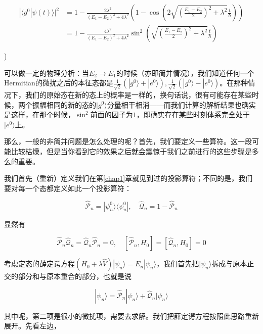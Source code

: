 \begin{equation}
\begin{split}
|\langle g^0|\psi(t)\rangle|^2 &= 1 - \frac{2\lambda^2}{(E_1-E_2)^2+4\lambda^2}\left(1-\cos\left(2\sqrt{\left( \frac{E_1-E_2}{2}\right)^2 + \lambda^2}\frac{t}{\hbar}\right)\right) \\
&= 1 - \frac{4\lambda^2}{(E_1-E_2)^2+4\lambda^2}\sin^2\left(\sqrt{\left( \frac{E_1-E_2}{2}\right)^2 + \lambda^2}\frac{t}{\hbar}\right)
\end{split}
\end{equation}

)

可以做一定的物理分析：当$E_2\to E_1$的时候（亦即简并情况），我们知道任何一个Hermitian的微扰之后的本征态都是$\frac{1}{\sqrt{2}}(|g^0\rangle + |e^0\rangle),\frac{1}{\sqrt{2}}(|g^0\rangle - |e^0\rangle)$。在那种情况下，我们的原始态在新的态上的概率是一样的，换句话说，很有可能存在某些时候，两个振幅相同的新的态的$|g^0\rangle$分量相干相消——而我们计算的解析结果也确实是这样，在那个时候，$\sin^2$前面的因子为$1$，即确实存在某些时刻体系完全处于$|e^0\rangle$上。


那么，一般的非简并问题是怎么处理的呢？首先，我们要定义一些算符。这一段可能比较枯燥，但是当你看到它的效果之后就会震惊于我们之前进行的这些步骤是多么的重要。

我们首先（重新）定义我们在第\ref{chap1}章就见到过的投影算符；不同的是，我们要对每一个态都定义如此一个投影算符：

\begin{equation}
\hat{\mathcal{P}}_n = |\psi^0_n\rangle\langle\psi^0_n|,\quad \hat{\mathcal{Q}}_n = 1-\hat{\mathcal{P}}_n 
\end{equation}

显然有

\begin{equation}
\hat{\mathcal{P}}_n \hat{\mathcal{Q}}_n = \hat{\mathcal{Q}}_n \hat{\mathcal{P}}_n =0,\quad [\hat{\mathcal{P}}_n ,H_0] = [\hat{\mathcal{Q}}_n ,H_0] = 0
\end{equation}

考虑定态的薛定谔方程$(H_0+\lambda \hat{V})|\psi_n\rangle = E_n|\psi_n\rangle$，我们首先把$|\psi_n\rangle$拆成与原本正交的部分和与原本重合的部分，也就是说

\begin{equation}
|\psi_n\rangle = \hat{\mathcal{P}}_n|\psi_n\rangle + \hat{\mathcal{Q}}_n|\psi_n\rangle
\end{equation}

其中呢，第二项是很小的微扰项，需要去求解。我们把薛定谔方程按照此思路重新展开。先看左边，

